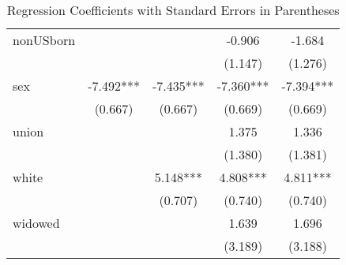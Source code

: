 \documentclass{article}
\begin{document}
\begin{table}[H]
{\begin{tabular}{lcccc}
    nonUSborn &  &  & -0.906 & -1.684 \\
              &  &  & (1.147) & (1.276) \\
    sex & -7.492*** & -7.435*** & -7.360*** & -7.394*** \\
        & (0.667) & (0.667) & (0.669) & (0.669) \\
    union &  &  & 1.375 & 1.336 \\
          &  &  & (1.380) & (1.381) \\
    white &  & 5.148*** & 4.808*** & 4.811*** \\
          &  & (0.707) & (0.740) & (0.740) \\
    widowed &  &  & 1.639 & 1.696 \\
            &  &  & (3.189) & (3.188) \\
    \bottomrule
    \end{tabular}}
    \caption{Regression Coefficients with Standard Errors in Parentheses}
    \label{tab:regression_results}
\end{table}
\end{document}
